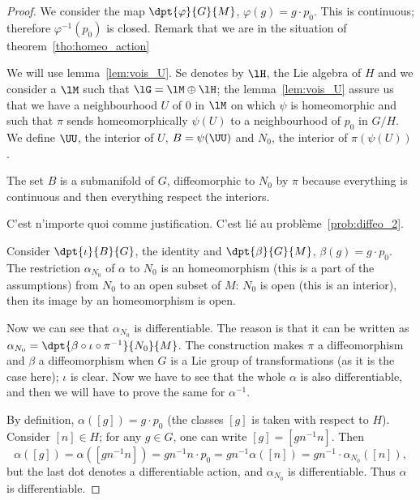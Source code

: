 \begin{proof}
We consider the map $\dpt{\varphi}{G}{M}$, $\varphi(g)=g\cdot p_0$. This is continuous; therefore $\varphi^{-1}(p_0)$ is closed. Remark that we are in the situation of theorem~\ref{tho:homeo_action}

We will use lemma~\ref{lem:vois_U}. Se denotes by $\lH$, the Lie algebra of $H$ and we consider a $\lM$ such that $\lG=\lM\oplus\lH$; the lemma~\ref{lem:vois_U} assure us that we have a neighbourhood $U$ of $0$ in $\lM$ on which $\psi$ is homeomorphic and such that $\pi$ sends homeomorphically $\psi(U)$ to a neighbourhood of $p_0$ in $G/H$. We define $\UU$, the interior of $U$, $B=\psi(\UU)$ and $N_0$, the interior of $\pi(\psi(U))$.

The set $B$ is a submanifold of $G$, diffeomorphic to $N_0$ by $\pi$ because everything is continuous and then everything respect the interiors.

\begin{probleme}
C'est n'importe quoi comme justification. C'est lié au problème~\ref{prob:diffeo_2}.
\label{prob:diffeo_1}
\end{probleme}

Consider $\dpt{\iota}{B}{G}$, the identity and $\dpt{\beta}{G}{M}$, $\beta(g)=g\cdot p_0$. The restriction $\alpha_{N_0}$ of $\alpha$ to $N_0$ is an homeomorphism (this is a part of the assumptions) from $N_0$ to an open subset of $M$: $N_0$ is open (this is an interior), then its image by an homeomorphism is open.

Now we can see that $\alpha_{N_0}$ is differentiable. The reason is that it can be written as $\alpha_{N_0}=\dpt{\beta\circ\iota\circ\pi^{-1}}{N_0}{M}$. The construction makes $\pi$ a diffeomorphism and $\beta$ a diffeomorphism when $G$ is a Lie group of transformations (as it is the case here); $\iota$ is clear. Now we have to see that the whole $\alpha$ is also differentiable, and then we will have to prove the same for $\alpha^{-1}$.

By definition, $\alpha([g])=g\cdot p_0$ (the classes $[g]$ is taken with respect to $H$). Consider $[n]\in H$; for any $g\in G$, one can write $[g]=[gn^{-1} n]$. Then
\begin{equation}
  \alpha([g])=\alpha([gn^{-1} n])
             =gn^{-1} n\cdot p_0
	     =gn^{-1}\alpha([n])
	     =gn^{-1}\cdot\alpha_{N_0}([n]),
\end{equation}
but the last dot denotes a differentiable action, and $\alpha_{N_0}$ is differentiable. Thus $\alpha$ is differentiable.


\end{proof}
